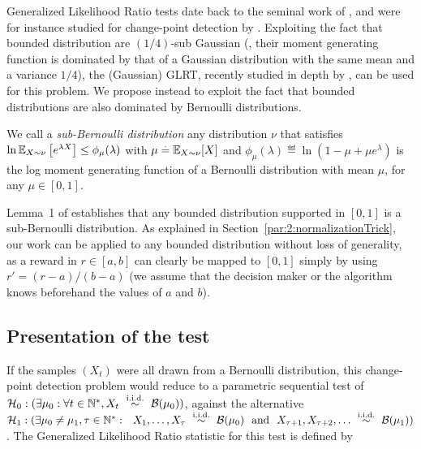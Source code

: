 Generalized Likelihood Ratio tests date back to the seminal work of \cite{Wilks1938}, and were for instance studied for change-point detection by \cite{barnard1959control,siegmund1995using}.
Exploiting the fact that bounded distribution are $(1/4)$-sub Gaussian (\ie, their moment generating function is dominated by that of a Gaussian distribution with the same mean and a variance $1/4$), the (Gaussian) GLRT, recently studied in depth by \cite{Maillard2018GLR}, can be used for this problem.
We propose instead to exploit the fact that bounded distributions are also dominated by Bernoulli distributions.

\begin{definition}\label{def:6:subBernoulliDistributions}
\begin{leftbar}[defnbar]  %
    We call a \emph{sub-Bernoulli distribution} any distribution $\nu$ that satisfies
    $\ln \mathbb{E}_{X\sim\nu}\left[e^{\lambda X}\right] \leq \phi_{\mu}(\lambda)$ with $\mu \overset{.}{=} \mathbb{E}_{X\sim \nu}[X]$ and $\phi_{\mu}(\lambda) \eqdef \ln(1-\mu + \mu e^\lambda)$ is the log moment generating function of a Bernoulli distribution with mean $\mu$, for any $\mu\in[0,1]$.
\end{leftbar}  %
\end{definition}

Lemma~1 of \cite{KLUCBJournal} establishes that any bounded distribution supported in $[0,1]$ is a sub-Bernoulli distribution.
As explained in Section~\ref{par:2:normalizationTrick}, our work can be applied to any bounded distribution without loss of generality, as a reward in $r\in[a,b]$ can clearly be mapped to $[0,1]$ simply by using $r' = (r-a)/(b-a)$ (we assume that the decision maker or the algorithm knows beforehand the values of $a$ and $b$).


\subsection{Presentation of the test}\label{sub:6:presentationOfGLRTest}

If the samples $(X_t)$ were all drawn from a Bernoulli distribution, this change-point detection problem would reduce to a parametric sequential test of
$\cH_0 : (\exists \mu_0: \forall t\in\N^*, X_t \ \overset{\text{i.i.d.}}{\sim} \ \cB(\mu_0))$,
against the alternative
$\cH_1 : (\exists \mu_0 \neq \mu_1, \tau \in \N^*: \ \  X_1, \dots, X_\tau \ \overset{\text{i.i.d.}}{\sim} \ \cB(\mu_0) \ \ \text{and} \ \ X_{\tau+1}, X_{\tau+2}, \dots \ \overset{\text{i.i.d.}}{\sim} \ \cB(\mu_1))$.
%
The Generalized Likelihood Ratio statistic for this test is defined by

